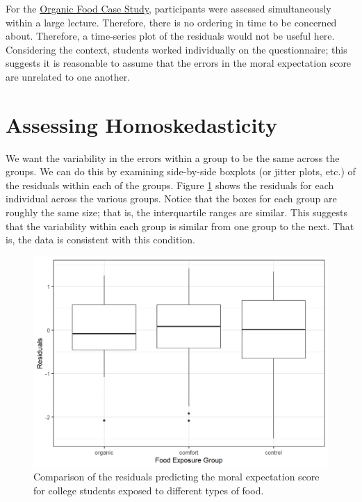 \documentclass[
]{book}
\theoremstyle{plain}
\theoremstyle{mydefn}
\theoremstyle{myexmpl}
\theoremstyle{remark}
\begin{document}
For the \protect\hyperlink{CaseOrganic}{Organic Food Case Study}, participants were assessed simultaneously within a large lecture. Therefore, there is no ordering in time to be concerned about. Therefore, a time-series plot of the residuals would not be useful here. Considering the context, students worked individually on the questionnaire; this suggests it is reasonable to assume that the errors in the moral expectation score are unrelated to one another.

\hypertarget{assessing-homoskedasticity-1}{%
\section{Assessing Homoskedasticity}\label{assessing-homoskedasticity-1}}

We want the variability in the errors within a group to be the same across the groups. We can do this by examining side-by-side boxplots (or jitter plots, etc.) of the residuals within each of the groups. Figure \ref{fig:anovaassessment-variance-organic} shows the residuals for each individual across the various groups. Notice that the boxes for each group are roughly the same size; that is, the interquartile ranges are similar. This suggests that the variability within each group is similar from one group to the next. That is, the data is consistent with this condition.

\begin{figure}

{\centering \includegraphics[width=0.8\linewidth]{./Images/anovaassessment-variance-organic-1} 

}

\caption{Comparison of the residuals predicting the moral expectation score for college students exposed to different types of food.}\label{fig:anovaassessment-variance-organic}
\end{figure}
\end{document}
